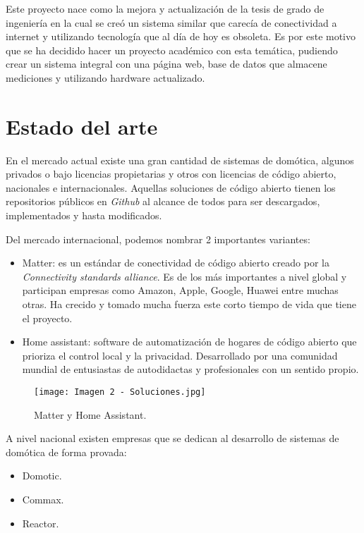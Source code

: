 Este proyecto nace como la mejora y actualización de la tesis de grado de ingeniería en la cual se creó un sistema similar que carecía de conectividad a internet y utilizando tecnología que al día de hoy es obsoleta. Es por este motivo que se ha decidido hacer un proyecto académico con esta temática, pudiendo crear un sistema integral con una página web, base de datos que almacene mediciones y utilizando hardware actualizado.

\section{Estado del arte}

En el mercado actual existe una gran cantidad de sistemas de domótica, algunos privados o bajo licencias propietarias y otros con licencias de código abierto, nacionales e internacionales. Aquellas soluciones de código abierto tienen los repositorios públicos en \textit{Github} al alcance de todos para ser descargados, implementados y hasta modificados.

Del mercado internacional, podemos nombrar 2 importantes variantes:
\begin{itemize}
	\item Matter: es un estándar de conectividad de código abierto creado por la \textit{Connectivity standards alliance}. Es de los más importantes a nivel global y participan empresas como Amazon, Apple, Google, Huawei entre muchas otras. Ha crecido y tomado mucha fuerza este corto tiempo de vida que tiene el proyecto. \citep{3}
	\item Home assistant: software de automatización de hogares de código abierto que prioriza el control local y la privacidad. Desarrollado por una comunidad mundial de entusiastas de autodidactas y profesionales con un sentido propio. \citep{4}
\end{itemize}

\begin{figure}[h]
\centering
\texttt{[image: Imagen 2 - Soluciones.jpg]}
\caption[Matter y Home Assistant]{Matter y Home Assistant. \footnotemark}
\label{fig:1}
\end{figure}

A nivel nacional existen empresas que se dedican al desarrollo de sistemas de domótica de forma provada:
\begin{itemize}
	\item Domotic. \citep{5}
	\item Commax. \citep{6}
	\item Reactor. \citep{7}
\end{itemize}

